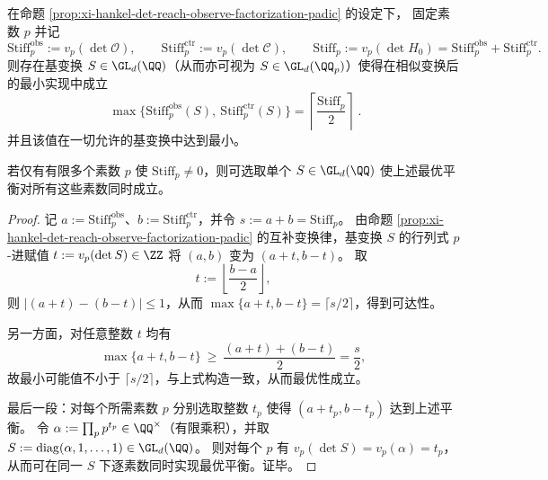 \begin{theorem}\label{thm:xi-hankel-stiffness-optimal-balance}
在命题 \ref{prop:xi-hankel-det-reach-observe-factorization-padic} 的设定下，
固定素数 \(p\) 并记
\[
\mathrm{Stiff}^{\mathrm{obs}}_p:=v_p(\det\mathcal O),\qquad
\mathrm{Stiff}^{\mathrm{ctr}}_p:=v_p(\det\mathcal C),\qquad
\mathrm{Stiff}_p:=v_p(\det H_0)=\mathrm{Stiff}^{\mathrm{obs}}_p+\mathrm{Stiff}^{\mathrm{ctr}}_p.
\]
则存在基变换 \(S\in \GL_d(\QQ)\)（从而亦可视为 \(S\in\GL_d(\QQ_p)\)）使得在相似变换后的最小实现中成立
\[
\boxed{\;
\max\bigl\{\mathrm{Stiff}^{\mathrm{obs}}_p(S),\ \mathrm{Stiff}^{\mathrm{ctr}}_p(S)\bigr\}
=\left\lceil \frac{\mathrm{Stiff}_p}{2}\right\rceil\; } .
\]
并且该值在一切允许的基变换中达到最小。
\par
若仅有有限多个素数 \(p\) 使 \(\mathrm{Stiff}_p\neq 0\)，则可选取单个 \(S\in\GL_d(\QQ)\) 使上述最优平衡对所有这些素数同时成立。
\end{theorem}
\begin{proof}
记 \(a:=\mathrm{Stiff}^{\mathrm{obs}}_p\)、\(b:=\mathrm{Stiff}^{\mathrm{ctr}}_p\)，并令 \(s:=a+b=\mathrm{Stiff}_p\)。
由命题 \ref{prop:xi-hankel-det-reach-observe-factorization-padic} 的互补变换律，基变换 \(S\) 的行列式 \(p\)-进赋值 \(t:=v_p(\det S)\in\ZZ\) 将 \((a,b)\) 变为 \((a+t,b-t)\)。
取
\[
t:=\left\lfloor\frac{b-a}{2}\right\rfloor,
\]
则 \(|(a+t)-(b-t)|\le 1\)，从而
\(
\max\{a+t,b-t\}=\lceil s/2\rceil
\)，得到可达性。
\par
另一方面，对任意整数 \(t\) 均有
\[
\max\{a+t,b-t\}\ \ge\ \frac{(a+t)+(b-t)}{2}=\frac{s}{2},
\]
故最小可能值不小于 \(\lceil s/2\rceil\)，与上式构造一致，从而最优性成立。
\par
最后一段：对每个所需素数 \(p\) 分别选取整数 \(t_p\) 使得 \((a+t_p,b-t_p)\) 达到上述平衡。
令 \(\alpha:=\prod_{p}p^{t_p}\in\QQ^\times\)（有限乘积），并取
\(
S:=\mathrm{diag}(\alpha,1,\dots,1)\in \GL_d(\QQ)
\)。
则对每个 \(p\) 有 \(v_p(\det S)=v_p(\alpha)=t_p\)，从而可在同一 \(S\) 下逐素数同时实现最优平衡。证毕。
\end{proof}

\endinput
